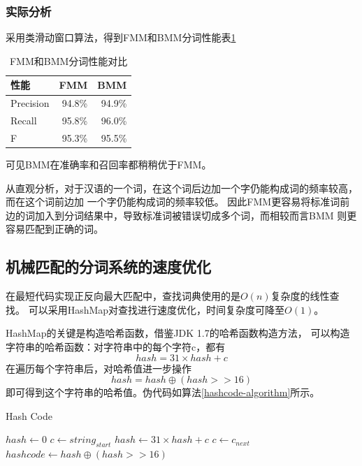 \subsubsection{实际分析}

采用类滑动窗口算法，得到FMM和BMM分词性能表\ref{seg_evaluate}

\begin{table}[H]
  \centering
  \begin{tabular}{lrr}
    \hline
    \textbf{性能} & \textbf{FMM} & \textbf{BMM} \\
    \hline
    Precision     & 94.8\%       & 94.9\%       \\
    Recall        & 95.8\%       & 96.0\%       \\
    F             & 95.3\%       & 95.5\%       \\
    \hline
  \end{tabular}
  \caption{FMM和BMM分词性能对比}
  \label{seg_evaluate}
\end{table}

可见BMM在准确率和召回率都稍稍优于FMM。

从直观分析，对于汉语的一个词，在这个词后边加一个字仍能构成词的频率较高，而在这个词前边加
一个字仍能构成词的频率较低。
因此FMM更容易将标准词前边的词加入到分词结果中，导致标准词被错误切成多个词，而相较而言BMM
则更容易匹配到正确的词。

\subsection{机械匹配的分词系统的速度优化}

在最短代码实现正反向最大匹配中，查找词典使用的是$O(n)$复杂度的线性查找。
可以采用HashMap对查找进行速度优化，时间复杂度可降至$O(1)$。

HashMap的关键是构造哈希函数，借鉴JDK 1.7的哈希函数构造方法，
可以构造字符串的哈希函数：对字符串中的每个字符c，都有
\begin{equation}
  \label{hash31}
  hash = 31 \times hash + c
\end{equation}
在遍历每个字符串后，对哈希值进一步操作
\begin{equation}
  hash = hash \oplus (hash >> 16)
\end{equation}
即可得到这个字符串的哈希值。伪代码如算法\ref{hashcode-algorithm}所示。
\begin{algorithm}
  \caption{Hash Code}
  \begin{algorithmic}
    \STATE $hash \gets 0$
    \STATE $c \gets string_{start}$
    \STATE $hash \gets 31 \times hash + c$
    \STATE $c \gets c_{next}$
    \ENDWHILE
    \STATE $hashcode \gets hash \oplus (hash >> 16)$
  \end{algorithmic}
  \label{hashcode-algorithm}
\end{algorithm}

